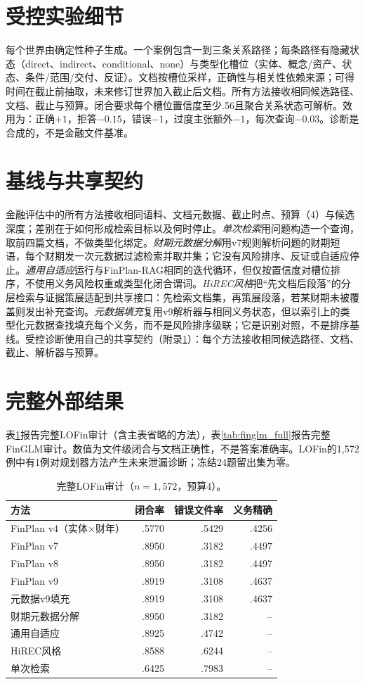 \documentclass[10.5pt,a4paper]{ctexart}
\newcommand{\finplan}{FinPlan\mbox{-}RAG}
\begin{document}
\section{受控实验细节}
\label{app:controlled}
每个世界由确定性种子生成。一个案例包含一到三条关系路径；每条路径有隐藏状态（direct、indirect、conditional、none）与类型化槽位（实体、概念/资产、状态、条件/范围/交付、反证）。文档按槽位采样，正确性与相关性依赖来源；可得时间在截止前抽取，未来修订世界加入截止后文档。所有方法接收相同候选路径、文档、截止与预算。闭合要求每个槽位置信度至少.56且聚合关系状态可解析。效用为：正确$+1$，拒答$-0.15$，错误$-1$，过度主张额外$-1$，每次查询$-0.03$。诊断是合成的，不是金融文件基准。

\section{基线与共享契约}
\label{app:baselines}
金融评估中的所有方法接收相同语料、文档元数据、截止时点、预算（4）与候选深度；差别在于如何形成检索目标以及何时停止。\emph{单次检索}用问题构造一个查询，取前四篇文档，不做类型化绑定。\emph{财期元数据分解}用v7规则解析问题的财期短语，每个财期发一次元数据过滤检索并取并集；它没有风险排序、反证或自适应停止。\emph{通用自适应}运行与\finplan{}相同的迭代循环，但仅按置信度对槽位排序，不使用义务风险权重或类型化闭合谓词。\emph{HiREC风格}把“先文档后段落”的分层检索与证据策展适配到共享接口：先检索文档集，再策展段落，若某财期未被覆盖则发出补充查询。\emph{元数据填充}复用v9解析器与相同义务状态，但以索引上的类型化元数据查找填充每个义务，而不是风险排序级联；它是识别对照，不是排序基线。受控诊断使用自己的共享契约（附录\ref{app:controlled}）：每个方法接收相同候选路径、文档、截止、解析器与预算。

\section{完整外部结果}
\label{app:external}
表\ref{tab:lofin_full}报告完整LOFin审计（含主表省略的方法），表\ref{tab:finglm_full}报告完整FinGLM审计。数值为文件级闭合与文档正确性，不是答案准确率。LOFin的1{,}572例中有1例对规划器方法产生未来泄漏诊断；冻结24题留出集为零。

\begin{table}[H]\centering\small
\caption{完整LOFin审计（$n=1{,}572$，预算4）。}
\label{tab:lofin_full}
\begin{tabular}{lrrr}
\toprule
方法 & 闭合率 & 错误文件率 & 义务精确\\
\midrule
FinPlan v4（实体$\times$财年） & .5770 & .5429 & .4256\\
FinPlan v7 & .8950 & .3182 & .4497\\
FinPlan v8 & .8950 & .3182 & .4497\\
FinPlan v9 & .8919 & .3108 & .4637\\
元数据v9填充 & .8919 & .3108 & .4637\\
财期元数据分解 & .8950 & .3182 & --\\
通用自适应 & .8925 & .4742 & --\\
HiREC风格 & .8588 & .6244 & --\\
单次检索 & .6425 & .7983 & --\\
\bottomrule
\end{tabular}
\end{table}
\end{document}
